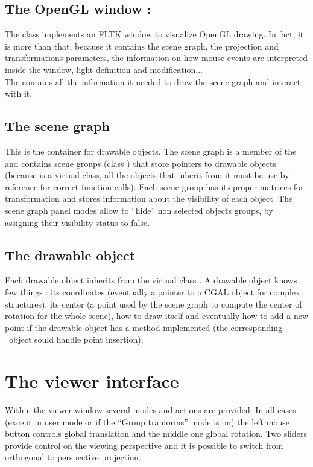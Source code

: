 \subsection{The OpenGL window : \protect {}}

The class  implements an FLTK window to visualize OpenGL
drawing. In fact, it is more than that, because it contains
the scene graph, the projection and transformations parameters, the
information on how mouse events are interpreted inside the window,
light definition and modification...\\
The  contains all the information it needed to draw the
scene graph and interact with it.

\subsection{The scene graph}

This is the container for drawable objects. The scene graph is a
member of the  and contains
scene groups (class ) that store pointers to
drawable objects (because  is a virtual class,
all the objects that inherit from it must be use by reference for
correct function calls). Each scene group has its proper matrices for
transformation and stores information about the visibility of each
object. The scene graph panel modes allow to ``hide'' non selected
objects groups, by assigning their visibility status to false.

\subsection{The drawable object}

Each drawable object inherits from the virtual class 
. A drawable object knows few things : its coordinates 
(eventually a pointer to a CGAL object for complex structures), its
center (a point used by the scene graph to compute the center of
rotation for the whole scene), how to draw itself and eventually how to add a
new point if the drawable object has a  method
implemented (the corresponding \cgal\ object sould handle point
insertion).

\section{The viewer interface}

Within the viewer window several modes and actions are provided. In
all cases (except in user mode or if the ``Group tranforms'' mode is
on) the left mouse button controls global translation and the middle
one global rotation. Two sliders provide control on the viewing
perspective and it is possible to switch from orthogonal to 
perspective projection. 

